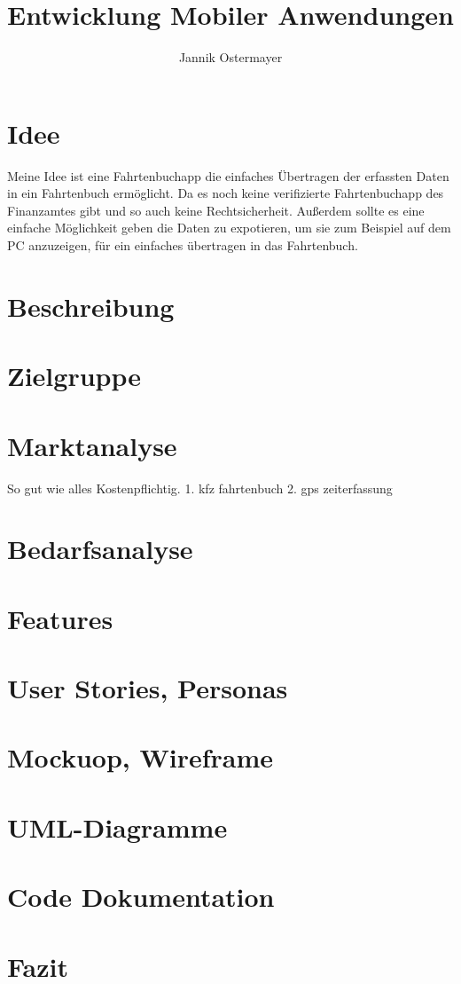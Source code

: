 \documentclass{article}
\title{Entwicklung Mobiler Anwendungen}
\author{Jannik Ostermayer}
\begin{document}
\begin{titlepage}
    \clearpage
    \maketitle          %
    \thispagestyle{empty}
\end{titlepage}

\tableofcontents    %
\pagebreak          %

\section{Idee}
Meine Idee ist eine Fahrtenbuchapp die einfaches Übertragen der erfassten Daten in ein Fahrtenbuch ermöglicht.
Da es noch keine verifizierte Fahrtenbuchapp des Finanzamtes gibt und so auch keine Rechtsicherheit.
Außerdem sollte es eine einfache Möglichkeit geben die Daten zu expotieren, um sie zum Beispiel auf dem
PC anzuzeigen, für ein einfaches übertragen in das Fahrtenbuch.

\section{Beschreibung}

\section{Zielgruppe}

\section{Marktanalyse}
So gut wie alles Kostenpflichtig.
1. kfz fahrtenbuch
2. gps zeiterfassung

\section{Bedarfsanalyse}

\section{Features}

\section{User Stories, Personas}

\section{Mockuop, Wireframe}

\section{UML-Diagramme}

\section{Code Dokumentation}

\section{Fazit}
\end{document}
